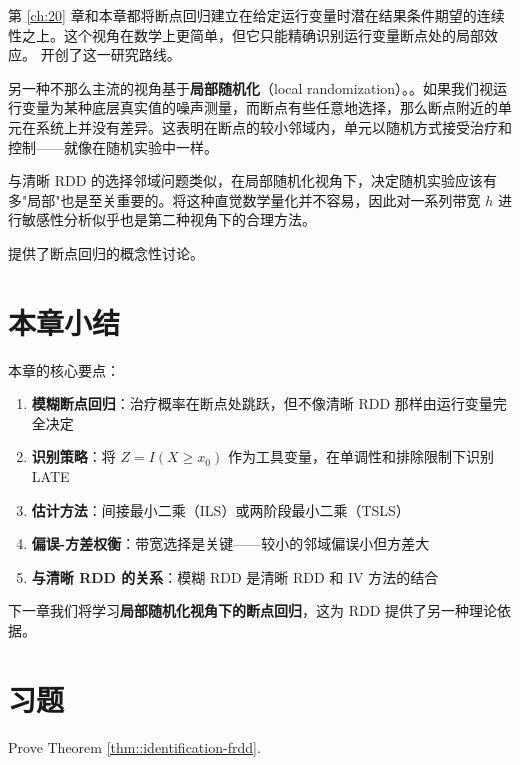第 \ref{ch:20} 章和本章都将断点回归建立在给定运行变量时潜在结果条件期望的连续性之上。这个视角在数学上更简单，但它只能精确识别运行变量断点处的局部效应。\citet{hahn2001identification} 开创了这一研究路线。

另一种不那么主流的视角基于\textbf{局部随机化}（local randomization）。\citep{cattaneo2015randomization, li2015evaluating}。如果我们视运行变量为某种底层真实值的噪声测量，而断点有些任意地选择，那么断点附近的单元在系统上并没有差异。这表明在断点的较小邻域内，单元以随机方式接受治疗和控制——就像在随机实验中一样。

与清晰 RDD 的选择邻域问题类似，在局部随机化视角下，决定随机实验应该有多"局部"也是至关重要的。将这种直觉数学量化并不容易，因此对一系列带宽 $h$ 进行敏感性分析似乎也是第二种视角下的合理方法。

\citet{sekhon2017interpreting} 提供了断点回归的概念性讨论。

\section{本章小结}

本章的核心要点：
\begin{enumerate}
  \item \textbf{模糊断点回归}：治疗概率在断点处跳跃，但不像清晰 RDD 那样由运行变量完全决定
  \item \textbf{识别策略}：将 $Z = I(X \geq x_0)$ 作为工具变量，在单调性和排除限制下识别 LATE
  \item \textbf{估计方法}：间接最小二乘（ILS）或两阶段最小二乘（TSLS）
  \item \textbf{偏误-方差权衡}：带宽选择是关键——较小的邻域偏误小但方差大
  \item \textbf{与清晰 RDD 的关系}：模糊 RDD 是清晰 RDD 和 IV 方法的结合
\end{enumerate}

下一章我们将学习\textbf{局部随机化视角下的断点回归}，这为 RDD 提供了另一种理论依据。

\section{习题}\label{sec:24-homework}

\begin{HomeworkProblem}\label{exr:24-1}

Prove Theorem \ref{thm::identification-frdd}.


\end{HomeworkProblem}


